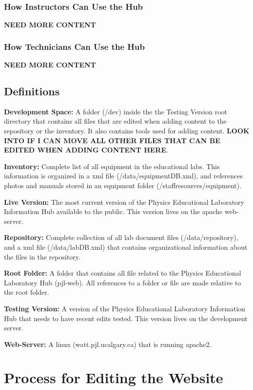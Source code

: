 \documentclass[justified]{LabArx1_5}
\begin{document}
\subsection{How Instructors Can Use the Hub}

{\bf NEED MORE CONTENT}


\subsection{How Technicians Can Use the Hub}

{\bf NEED MORE CONTENT}

\section{Definitions}\label{sec:definitions}

{\bf Development Space:} A folder (/dev) inside the the Testing Version root directory that contains all files that are edited when adding content to the repository or the inventory. It also contains tools used for adding content. {\bf LOOK INTO IF I CAN MOVE ALL OTHER FILES THAT CAN BE EDITED WHEN ADDING CONTENT HERE}.

{\bf Inventory:} Complete list of all equipment in the educational labs. This information is organized in a xml file (/data/equipmentDB.xml), and references photos and manuals stored in an equipment folder (/staffresources/equipment). 

{\bf Live Version:} The most current version of the Physics Educational Laboratory Information Hub available to the public. This version lives on the apache web-server. 

{\bf Repository:} Complete collection of all lab document files (/data/repository), and a xml file (/data/labDB.xml) that contains organizational information about the files in the repository.

{\bf Root Folder:} A folder that contains all file related to the Physics Educational Laboratory Hub (pjl-web). All references to a folder or file are made relative to the root folder.

{\bf Testing Version:} A version of the Physics Educational Laboratory Information Hub that needs to have recent edits tested. This version lives on the development server. 

{\bf Web-Server:} A linux (watt.pjl.ucalgary.ca) that is running apache2.

\chapter{Process for Editing the Website}
\end{document}
